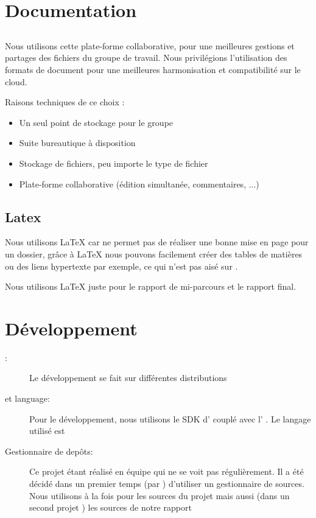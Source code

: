 \section{Documentation}
\subsection{\googleDrive}
Nous utilisons cette plate-forme collaborative, pour une meilleures gestions et partages des fichiers du groupe de travail. Nous privilégions l'utilisation des formats de document \google pour une meilleures harmonisation et compatibilité sur le cloud.

Raisons techniques de ce choix :
\begin{itemize}
\item Un seul point de stockage pour le groupe
\item Suite bureautique à disposition
\item Stockage de fichiers, peu importe le type de fichier
\item Plate-forme collaborative (édition simultanée, commentaires, ...)
\end{itemize}

\subsection{Latex}
Nous utilisons \LaTeX{} car \googleDocuments{} ne permet pas de réaliser une bonne mise en page pour un dossier, gr\^{a}ce à \LaTeX{} nous pouvons facilement créer des tables de matières ou des liens hypertexte par exemple, ce qui n'est pas aisé sur \googleDocuments{}.

Nous utilisons \LaTeX{} juste pour le rapport de mi-parcours et le rapport final.

\section{Développement}
\begin{description}
\item[\os{}:] Le développement se fait sur différentes distributions \linux{}
\item[\ide{} et language:] Pour le développement, nous utilisons le SDK d'\android{} couplé avec l'\ide{} \eclipse{}. Le langage utilisé est \java{}
\item[Gestionnaire de depôts:] Ce projet étant réalisé en équipe qui ne se voit pas régulièrement. Il a été décidé dans un premier temps (par \responsableProjet{}) d'utiliser un gestionnaire de sources. Nous utilisons \github{} à la fois pour les sources du projet mais aussi (dans un second projet \github{}) les sources de notre rapport
\end{description}
